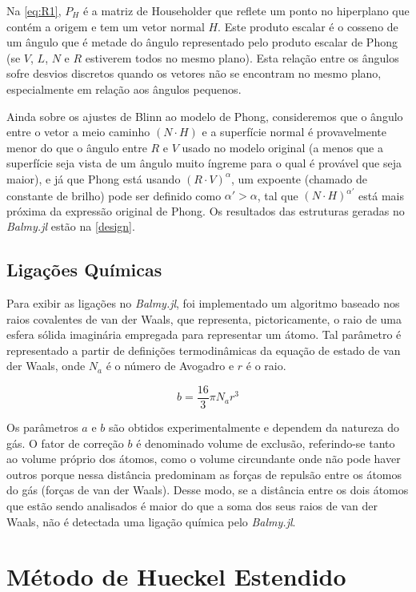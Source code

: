 Na \autoref{eq:R1}, $P_H$ é a matriz de Householder que reflete um ponto no hiperplano que contém a origem e tem um vetor normal $H$. Este produto escalar é o cosseno de um ângulo que é metade do ângulo representado pelo produto escalar de Phong (se $V$, $L$, $N$ e $R$ estiverem todos no mesmo plano). Esta relação entre os ângulos sofre desvios discretos quando os vetores não se encontram no mesmo plano, especialmente em relação aos ângulos pequenos.

Ainda sobre os ajustes de Blinn ao modelo de Phong, consideremos que o ângulo entre o vetor a meio caminho $(N \cdot H)$ e a superfície normal é provavelmente menor do que o ângulo entre $R$ e $V$ usado no modelo original (a menos que a superfície seja vista de um ângulo muito íngreme para o qual é provável que seja maior), e já que Phong está usando $(R \cdot V)^\alpha$, um expoente (chamado de constante de brilho) pode ser definido como $\alpha' > \alpha$, tal que $(N \cdot H)^{\alpha'}$ está mais próxima da expressão original de Phong. Os resultados das estruturas geradas no \textit{Balmy.jl} estão na \autoref{design}.

\subsection{Ligações Químicas}

Para exibir as ligações no \textit{Balmy.jl}, foi implementado um algoritmo baseado nos raios covalentes de van der Waals, que representa, pictoricamente, o raio de uma esfera sólida imaginária empregada para representar um átomo. Tal parâmetro é representado a partir de definições termodinâmicas da equação de estado de van der Waals, onde $N_a$ é o número de Avogadro e $r$ é o raio.

\begin{equation}
    b = \frac{16}{3} \pi N_a r^3
\end{equation}

Os parâmetros $a$ e $b$ são obtidos experimentalmente e dependem da natureza do gás. O fator de correção $b$ é denominado volume de exclusão, referindo-se tanto ao volume próprio dos átomos, como o volume circundante onde não pode haver outros porque nessa distância predominam as forças de repulsão entre os átomos do gás (forças de van der Waals). Desse modo, se a distância entre os dois átomos que estão sendo analisados é maior do que a soma dos seus raios de van der Waals, não é detectada uma ligação química pelo \textit{Balmy.jl}.

\section{Método de Hueckel Estendido}

